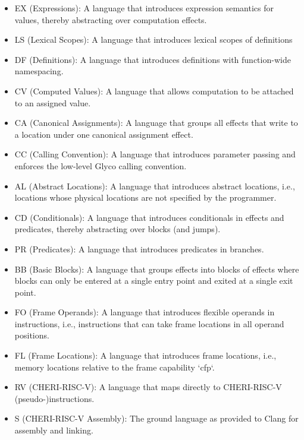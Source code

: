 
\begin{itemize}
	\item EX (Expressions): A language that introduces expression semantics for values, thereby abstracting over computation effects.
	\item LS (Lexical Scopes): A language that introduces lexical scopes of definitions
	\item DF (Definitions): A language that introduces definitions with function-wide namespacing.
	\item CV (Computed Values): A language that allows computation to be attached to an assigned value.
	\item CA (Canonical Assignments): A language that groups all effects that write to a location under one canonical assignment effect.
	\item CC (Calling Convention): A language that introduces parameter passing and enforces the low-level Glyco calling convention.
	\item AL (Abstract Locations): A language that introduces abstract locations, i.e., locations whose physical locations are not specified by the programmer.
	\item CD (Conditionals): A language that introduces conditionals in effects and predicates, thereby abstracting over blocks (and jumps).
	\item PR (Predicates): A language that introduces predicates in branches.
	\item BB (Basic Blocks): A language that groups effects into blocks of effects where blocks can only be entered at a single entry point and exited at a single exit point.
	\item FO (Frame Operands): A language that introduces flexible operands in instructions, i.e., instructions that can take frame locations in all operand positions.
	\item FL (Frame Locations): A language that introduces frame locations, i.e., memory locations relative to the frame capability `cfp`.
	\item RV (CHERI-RISC-V): A language that maps directly to CHERI-RISC-V (pseudo-)instructions.
	\item S (CHERI-RISC-V Assembly): The ground language as provided to Clang for assembly and linking.
\end{itemize}